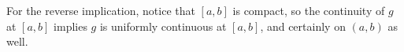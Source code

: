 \documentclass{article}
\begin{document}
\begin{enumerate}
\begin{enumerate}
        For the reverse implication, notice that $[a, b]$ is compact, so the continuity of $g$ at $[a, b]$ implies $g$ is uniformly continuous at $[a, b]$, and certainly on $(a, b)$ as well.
    \end{enumerate}
    
\end{enumerate}
\end{document}
